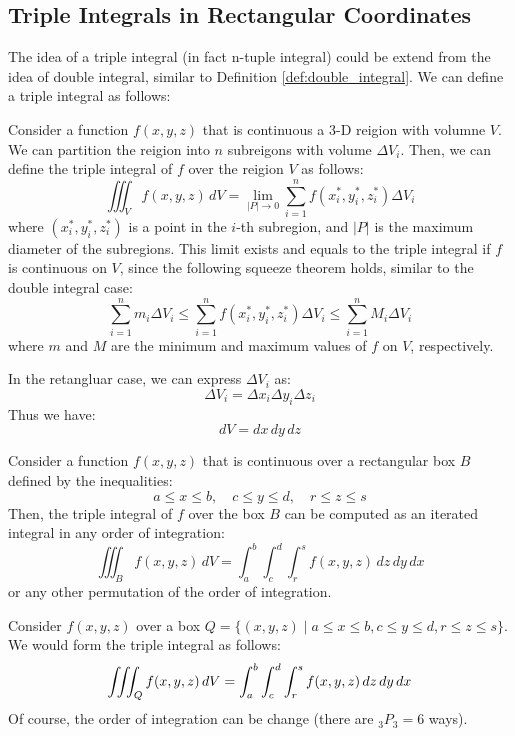 \documentclass[11pt]{report}
\begin{document}
\subsection{Triple Integrals in Rectangular Coordinates}
The idea of a triple integral (in fact n-tuple integral) could be extend from the idea of double integral, similar to 
Definition \ref{def:double_integral}. We can define a triple integral as follows:
\begin{definition}
    Consider a function $f(x,y,z)$ that is continuous a 
    3-D reigion with volumne $V$. We can partition the reigion into $n$ subreigons with volume $\Delta V_i$. Then, we can define the triple integral of $f$ over the reigion $V$ as follows:
    \begin{equation}
        \iiint_V f(x,y,z) \, dV = \lim_{|P| \to 0} \sum_{i=1}^n f(x_i^*, y_i^*, z_i^*) \Delta V_i
    \end{equation}
    where $(x_i^*, y_i^*, z_i^*)$ is a point in the $i$-th subregion, and $|P|$ is the maximum diameter of the subregions. This limit exists and equals to the triple integral if $f$ is continuous on $V$, since the following squeeze theorem holds, similar to the double integral case:
    $$       
     \sum_{i=1}^n m_i \Delta V_i \le \sum_{i=1}^n f(x_i^*, y_i^*, z_i^*) \Delta V_i \le \sum_{i=1}^n M_i \Delta V_i
    $$
    where $m$ and $M$ are the minimum and maximum values of $f$ on $V$, respectively.

    In the retangluar case, we can express $\Delta V_i$ as:
    $$        
    \Delta V_i = \Delta x_i \Delta y_i \Delta z_i
    $$
    Thus we have:
    $$
    dV = dx \, dy \, dz
    $$
\end{definition}

\begin{definition}
    Consider a function $f(x,y,z)$ that is continuous over a rectangular box $B$ defined by the inequalities:
    $$
        a \le x \le b, \quad c \le y \le d, \quad r \le z \le s
    $$
    Then, the triple integral of $f$ over the box $B$ can be computed as an iterated integral in any order of integration:
    \begin{equation}
        \iiint_B f(x,y,z) \, dV = \int_a^b \int_c^d \int_r^s f(x,y,z) \, dz \, dy \, dx
    \end{equation}
    or any other permutation of the order of integration.
    
\end{definition}

\begin{example}
    Consider $f(x,y,z)$ over a box $Q = \{(x,y,z) \mid a \le x \le b , c \le y \le d, r \le z \le s\}$. We would form the triple integral as follows:
    $$
        \iiint_Q f(x,y,z) \, dV = \int_a^b \int_c^d \int_r^s f(x,y,z) \, dz \, dy \, dx \\
    $$
    Of course, the order of integration can be change (there are $_3P_3= 6$ ways).
\end{example}
\end{document}
